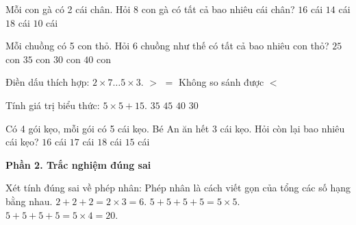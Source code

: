 \begin{ex} %
Mỗi con gà có 2 cái chân. Hỏi 8 con gà có tất cả bao nhiêu cái chân?
\choice
{\True $16$ cái}
{$14$ cái}
{$18$ cái}
{$10$ cái}
\end{ex}

\begin{ex} %
Mỗi chuồng có 5 con thỏ. Hỏi 6 chuồng như thế có tất cả bao nhiêu con thỏ?
\choice
{$25$ con}
{$35$ con}
{\True $30$ con}
{$40$ con}
\end{ex}

\begin{ex} %
Điền dấu thích hợp: $2 \times 7 \dots 5 \times 3$.
\choice
{$>$}
{$=$}
{Không so sánh được}
{\True $<$}
\end{ex}

\begin{ex} %
Tính giá trị biểu thức: $5 \times 5 + 15$.
\choice
{$35$}
{$45$}
{\True $40$}
{$30$}
\end{ex}

\begin{ex} %
Có 4 gói kẹo, mỗi gói có 5 cái kẹo. Bé An ăn hết 3 cái kẹo. Hỏi còn lại bao nhiêu cái kẹo?
\choice
{$16$ cái}
{\True $17$ cái}
{$18$ cái}
{$15$ cái}
\end{ex}

\textbf{Phần 2. Trắc nghiệm đúng sai}

\begin{ex} %
Xét tính đúng sai về phép nhân:
\choiceTF
{\True Phép nhân là cách viết gọn của tổng các số hạng bằng nhau.}
{\True $2 + 2 + 2 = 2 \times 3 = 6$.}
{$5 + 5 + 5 + 5 = 5 \times 5$.}
{\True $5 + 5 + 5 + 5 = 5 \times 4 = 20$.}
\end{ex}

